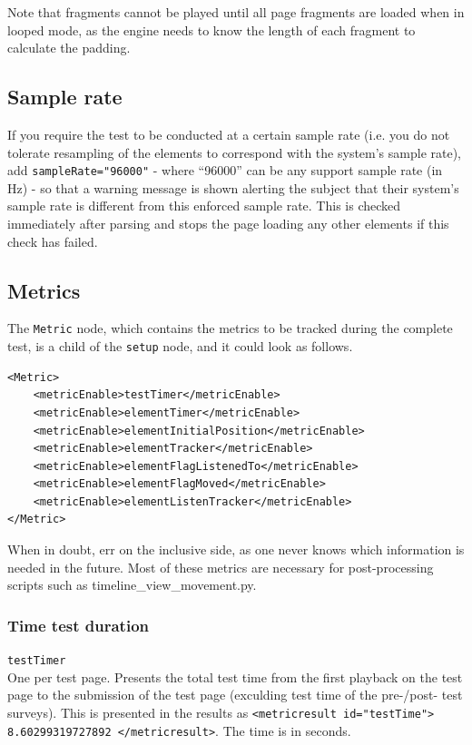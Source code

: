 \documentclass[11pt, oneside]{article}   	%
\begin{document}
		Note that fragments cannot be played until all page fragments are loaded when in looped mode, as the engine needs to know the length of each fragment to calculate the padding.

	\subsection{Sample rate}
	\label{sec:samplerate}
		If you require the test to be conducted at a certain sample rate (i.e. you do not tolerate resampling of the elements to correspond with the system's sample rate), add \texttt{sampleRate="96000"} - where ``96000'' can be any support sample rate (in Hz) - so that a warning message is shown alerting the subject that their system's sample rate is different from this enforced sample rate. This is checked immediately after parsing and stops the page loading any other elements if this check has failed.

	\subsection{Metrics}
		The \texttt{Metric} node, which contains the metrics to be tracked during the complete test, is a child of the \texttt{setup} node, and it could look as follows.

		\begin{lstlisting}
<Metric>
	<metricEnable>testTimer</metricEnable>
	<metricEnable>elementTimer</metricEnable>
	<metricEnable>elementInitialPosition</metricEnable>
	<metricEnable>elementTracker</metricEnable>
	<metricEnable>elementFlagListenedTo</metricEnable>
	<metricEnable>elementFlagMoved</metricEnable>
	<metricEnable>elementListenTracker</metricEnable>
</Metric>
		\end{lstlisting}

		When in doubt, err on the inclusive side, as one never knows which information is needed in the future. Most of these metrics are necessary for post-processing scripts such as timeline\_view\_movement.py. %

		\subsubsection{Time test duration}
			\texttt{testTimer}\\
			One per test page. Presents the total test time from the first playback on the test page to the submission of the test page (exculding test time of the pre-/post- test surveys). This is presented in the results as \texttt{<metricresult id="testTime"> 8.60299319727892 </metricresult>}. The time is in seconds.
\end{document}
